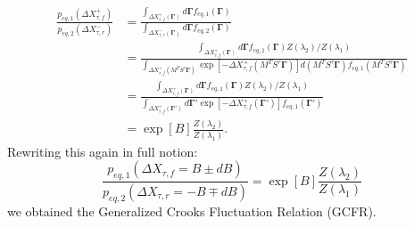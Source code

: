 \documentclass[a4paper,12pt]{article}
\begin{document}
\begin{equation}
\begin{aligned}
\frac{p_{eq,1}(\Delta X_{\tau,f}^+)}{p_{eq,2}(\Delta X_{\tau,r}^-)}
&=\frac{\int_{\Delta X_{\tau,f}^+(\bm{\Gamma})} d\bm{\Gamma} f_{eq,1}(\bm{\Gamma})}{\int_{\Delta X_{\tau,r}^-(\bm{\Gamma})} d\bm{\Gamma} f_{eq,2}(\bm{\Gamma})} \\
&= \frac{\int_{\Delta X_{\tau,f}^+(\bm{\Gamma})} d\bm{\Gamma} f_{eq,1}(\bm{\Gamma})Z(\lambda_2)/Z(\lambda_1)}{\int_{\Delta X_{\tau,f}^+(M^T S^{\tau}\bm{\Gamma})} \exp[-\Delta X_{\tau,f}^+(M^T S^{\tau}\bm{\Gamma})] d(M^T S^{\tau}\bm{\Gamma}) f_{eq,1}(M^T S^{\tau}\bm{\Gamma})} \\
&=\frac{\int_{\Delta X_{\tau,f}^+(\bm{\Gamma})} d\bm{\Gamma} f_{eq,1}(\bm{\Gamma}) Z(\lambda_2)/Z(\lambda_1)}{\int_{\Delta X_{\tau,f}^+(\bm{\Gamma}')} d\bm{\Gamma}' \exp[-\Delta X_{\tau,f}^+(\bm{\Gamma}')] f_{eq,1}(\bm{\Gamma}')} \\
&= \exp[B] \frac{Z(\lambda_2)}{Z(\lambda_1)}.
\end{aligned}
\end{equation}
Rewriting this again in full notion:
\begin{equation}
\label{GCFR}
\frac{p_{eq,1}(\Delta X_{\tau,f}=B\pm dB)}{p_{eq,2}(\Delta X_{\tau,r}=-B\mp dB)}= \exp[B] \frac{Z(\lambda_2)}{Z(\lambda_1)}
\end{equation}
we obtained the Generalized Crooks Fluctuation Relation (GCFR).
\end{document}
